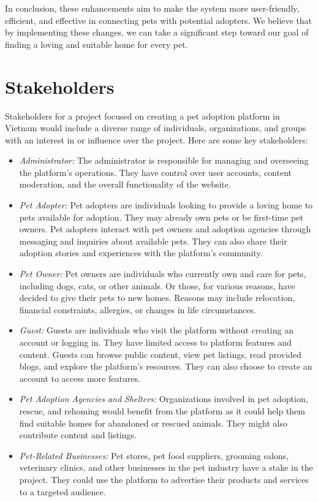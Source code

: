 In conclusion, these enhancements aim to make the system more user-friendly, efficient, and effective in connecting pets with potential adopters. We believe that by implementing these changes, we can take a significant step toward our goal of finding a loving and suitable home for every pet.

\section{Stakeholders}
Stakeholders for a project focused on creating a pet adoption platform in Vietnam would include a diverse range of individuals, organizations, and groups with an interest in or influence over the project. Here are some key stakeholders:
\begin{itemize}
  \item \textit{Administrator:} The administrator is responsible for managing and overseeing the platform's operations. They have control over user accounts, content moderation, and the overall functionality of the website.
  \item \textit{Pet Adopter:} Pet adopters are individuals looking to provide a loving home to pets available for adoption. They may already own pets or be first-time pet owners. Pet adopters interact with pet owners and adoption agencies through messaging and inquiries about available pets. They can also share their adoption stories and experiences with the platform's community.
  \item \textit{Pet Owner:} Pet owners are individuals who currently own and care for pets, including dogs, cats, or other animals. Or those, for various reasons, have decided to give their pets to new homes. Reasons may include relocation, financial constraints, allergies, or changes in life circumstances.
  \item \textit{Guest:} Guests are individuals who visit the platform without creating an account or logging in. They have limited access to platform features and content. Guests can browse public content, view pet listings, read provided blogs, and explore the platform's resources. They can also choose to create an account to access more features.
  \item \textit{Pet Adoption Agencies and Shelters:} Organizations involved in pet adoption, rescue, and rehoming would benefit from the platform as it could help them find suitable homes for abandoned or rescued animals. They might also contribute content and listings.
  \item \textit{Pet-Related Businesses:} Pet stores, pet food suppliers, grooming salons, veterinary clinics, and other businesses in the pet industry have a stake in the project. They could use the platform to advertise their products and services to a targeted audience.

\end{itemize}

